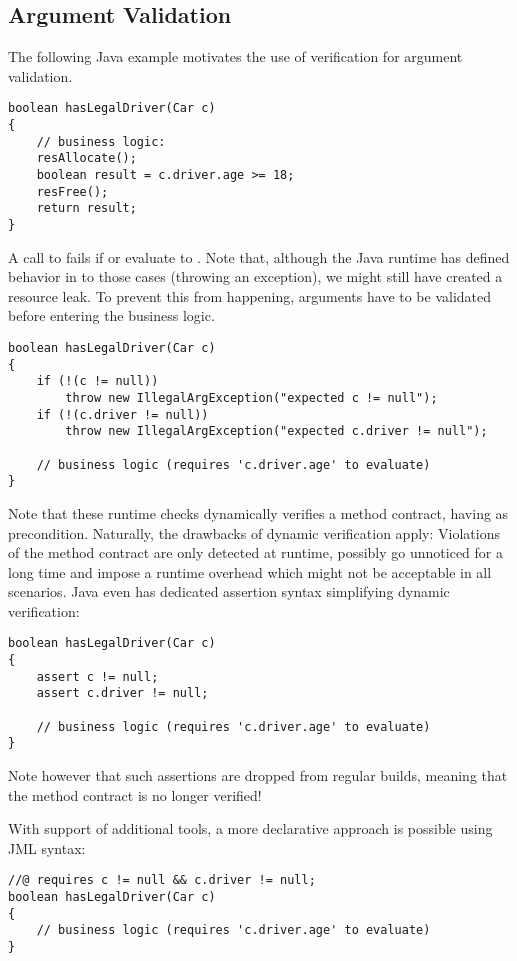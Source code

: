 
\subsection{Argument Validation}
\label{ssec:argument-validation}
The following Java example motivates the use of verification for argument validation.
\begin{lstlisting}
boolean hasLegalDriver(Car c)
{
    // business logic:
    resAllocate();
    boolean result = c.driver.age >= 18;
    resFree();
    return result;
}
\end{lstlisting}
A call to  fails if  or  evaluate to .
Note that, although the Java runtime has defined behavior in to those cases (throwing an exception), we might still have created a resource leak.
To prevent this from happening, arguments have to be validated before entering the business logic.
\begin{lstlisting}
boolean hasLegalDriver(Car c)
{
    if (!(c != null))
        throw new IllegalArgException("expected c != null");
    if (!(c.driver != null))
        throw new IllegalArgException("expected c.driver != null");
        
    // business logic (requires 'c.driver.age' to evaluate)
}
\end{lstlisting}

Note that these runtime checks dynamically verifies a method contract, having  as precondition.
Naturally, the drawbacks of dynamic verification apply:
Violations of the method contract are only detected at runtime, possibly go unnoticed for a long time and impose a runtime overhead which might not be acceptable in all scenarios.
Java even has dedicated assertion syntax simplifying dynamic verification:
\begin{lstlisting}
boolean hasLegalDriver(Car c)
{
    assert c != null;
    assert c.driver != null;

    // business logic (requires 'c.driver.age' to evaluate)
}
\end{lstlisting}
Note however that such assertions are dropped from regular builds, meaning that the method contract is no longer verified!

With support of additional tools, a more declarative approach is possible using JML syntax:
\begin{lstlisting}
//@ requires c != null && c.driver != null;
boolean hasLegalDriver(Car c)
{
    // business logic (requires 'c.driver.age' to evaluate)
}
\end{lstlisting}

